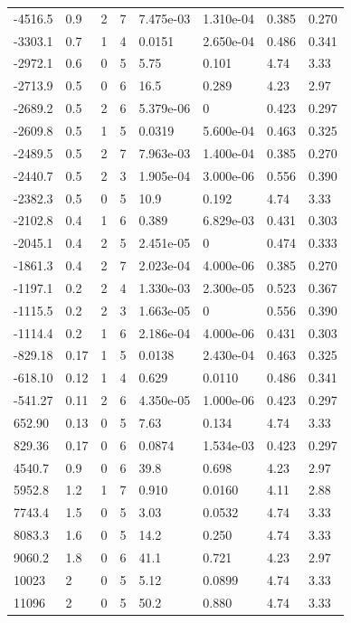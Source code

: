 \documentclass[preview]{standalone}
\begin{document}
{{\begin{tabular}{L{1.2cm}C{1.2cm} C{0.3cm}C{0.5cm} C{1.4cm}C{1.4cm} C{1.4cm}C{1.4cm}}
  -4516.5  &   0.9  & 2     &  7 &  7.475e-03  & 1.310e-04  & 0.385 &  0.270   \\ 
  -3303.1  &   0.7  & 1     &  4 &  0.0151  & 2.650e-04  & 0.486 &  0.341   \\ 
  -2972.1  &   0.6  & 0     &  5 &  5.75  & 0.101  & 4.74 &  3.33   \\ 
  -2713.9  &   0.5  & 0     &  6 &  16.5  & 0.289  & 4.23 &  2.97   \\ 
  -2689.2  &   0.5  & 2     &  6 &  5.379e-06  & 0  & 0.423 &  0.297   \\ 
  -2609.8  &   0.5  & 1     &  5 &  0.0319  & 5.600e-04  & 0.463 &  0.325   \\ 
  -2489.5  &   0.5  & 2     &  7 &  7.963e-03  & 1.400e-04  & 0.385 &  0.270   \\ 
  -2440.7  &   0.5  & 2     &  3 &  1.905e-04  & 3.000e-06  & 0.556 &  0.390   \\ 
  -2382.3  &   0.5  & 0     &  5 &  10.9  & 0.192  & 4.74 &  3.33   \\ 
  -2102.8  &   0.4  & 1     &  6 &  0.389  & 6.829e-03  & 0.431 &  0.303   \\ 
  -2045.1  &   0.4  & 2     &  5 &  2.451e-05  & 0  & 0.474 &  0.333   \\ 
  -1861.3  &   0.4  & 2     &  7 &  2.023e-04  & 4.000e-06  & 0.385 &  0.270   \\ 
  -1197.1  &   0.2  & 2     &  4 &  1.330e-03  & 2.300e-05  & 0.523 &  0.367   \\ 
  -1115.5  &   0.2  & 2     &  3 &  1.663e-05  & 0  & 0.556 &  0.390   \\ 
  -1114.4  &   0.2  & 1     &  6 &  2.186e-04  & 4.000e-06  & 0.431 &  0.303   \\ 
  -829.18  &  0.17  & 1     &  5 &  0.0138  & 2.430e-04  & 0.463 &  0.325   \\ 
  -618.10  &  0.12  & 1     &  4 &  0.629  & 0.0110  & 0.486 &  0.341   \\ 
  -541.27  &  0.11  & 2     &  6 &  4.350e-05  & 1.000e-06  & 0.423 &  0.297   \\ 
  652.90  &  0.13  & 0     &  5 &  7.63  & 0.134  & 4.74 &  3.33   \\ 
  829.36  &  0.17  & 0     &  6 &  0.0874  & 1.534e-03  & 0.423 &  0.297   \\ 
  4540.7  &   0.9  & 0     &  6 &  39.8  & 0.698  & 4.23 &  2.97   \\ 
  5952.8  &   1.2  & 1     &  7 &  0.910  & 0.0160  & 4.11 &  2.88   \\ 
  7743.4  &   1.5  & 0     &  5 &  3.03  & 0.0532  & 4.74 &  3.33   \\ 
  8083.3  &   1.6  & 0     &  5 &  14.2  & 0.250  & 4.74 &  3.33   \\ 
  9060.2  &   1.8  & 0     &  6 &  41.1  & 0.721  & 4.23 &  2.97   \\ 
  10023  &     2  & 0     &  5 &  5.12  & 0.0899  & 4.74 &  3.33   \\ 
  11096  &     2  & 0     &  5 &  50.2  & 0.880  & 4.74 &  3.33   \\ 
\hline 
\end{tabular} 

}}
\end{document}
